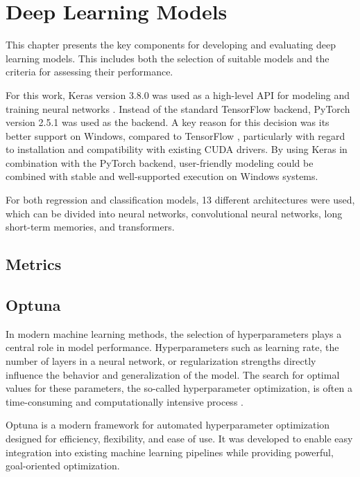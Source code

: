 \section{Deep Learning Models}

This chapter presents the key components for developing and evaluating deep learning models. This includes both the selection of suitable models and the criteria for assessing their performance.

For this work, Keras version 3.8.0 was used as a high-level API for modeling and training neural networks \cite{keras-home}. Instead of the standard TensorFlow backend, PyTorch version 2.5.1 was used as the backend. A key reason for this decision was its better support on Windows, compared to TensorFlow \cite{tf-windows}, particularly with regard to installation and compatibility with existing CUDA drivers. By using Keras in combination with the PyTorch backend, user-friendly modeling could be combined with stable and well-supported execution on Windows systems.


For both regression and classification models, 13 different architectures were used, which can be divided into neural networks, convolutional neural networks, long short-term memories, and transformers.

\subsection{Metrics}

\subsection{Optuna}

In modern machine learning methods, the selection of hyperparameters plays a central role in model performance. Hyperparameters such as learning rate, the number of layers in a neural network, or regularization strengths directly influence the behavior and generalization of the model. The search for optimal values for these parameters, the so-called hyperparameter optimization, is often a time-consuming and computationally intensive process \cite{hyperparameter-importance}.

Optuna is a modern framework for automated hyperparameter optimization designed for efficiency, flexibility, and ease of use. It was developed to enable easy integration into existing machine learning pipelines while providing powerful, goal-oriented optimization.

